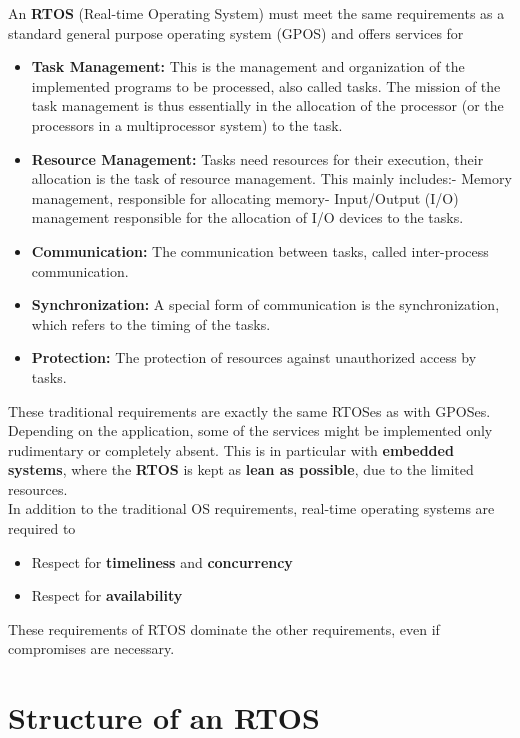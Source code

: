 An \textbf{RTOS} (Real-time Operating System) must meet the same requirements as a standard general purpose operating system (GPOS) and offers services for

\begin{itemize}
\item  \textbf{Task Management: }This is the management and organization of the implemented programs to be processed, also called tasks. The mission of the task management is thus essentially in the allocation of the processor (or the processors in a multiprocessor system) to the task.
\item  \textbf{Resource Management: }Tasks need resources for their execution, their allocation is the task of resource management. This mainly includes:- Memory management, responsible for allocating memory- Input/Output (I/O) management responsible for the allocation of I/O devices to  the tasks.
\item  \textbf{Communication: }The communication between tasks, called inter-process communication.
\item  \textbf{Synchronization: }A special form of communication is the synchronization, which refers to the timing of the tasks.
\item  \textbf{Protection: }The protection of resources against unauthorized access by tasks.
\end{itemize}

These traditional requirements are exactly the same RTOSes as with GPOSes. Depending on the application, some of the services might be implemented only  rudimentary or completely absent. This is in particular with \textbf{embedded} \textbf{systems}, where the \textbf{RTOS} is kept as \textbf{lean as possible}, due to the limited resources.\\

In addition to the traditional OS requirements, real-time operating systems are required to 

\begin{itemize}
	\item  Respect for \textbf{timeliness} and \textbf{concurrency}
	\item  Respect for \textbf{availability}
\end{itemize}

These requirements of RTOS dominate the other requirements, even if compromises are necessary.

\section{Structure of an RTOS}

